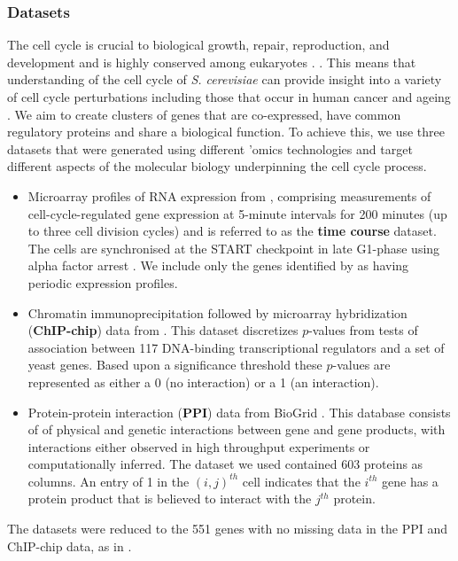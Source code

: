 \documentclass{bmcart}
\begin{document}
	\subsubsection*{Datasets}
	The cell cycle is crucial to biological growth, repair, reproduction, and development \citep{tyson2013cell, chen2004integrative, alberts2018molecular} and is highly conserved among eukaryotes \citep{alberts2018molecular}. . This means that understanding of the cell cycle of \emph{S. cerevisiae} can provide insight into a variety of cell cycle perturbations including those that occur in human cancer \citep{ingalls2007systems, chen2004integrative} and ageing \citep{jimenez2015live}. We aim to create clusters of genes that are co-expressed, have common regulatory proteins and share a biological function. To achieve this, we use three datasets that were generated using different 'omics technologies and target different aspects of the molecular biology underpinning the cell cycle process.
	\begin{itemize}
		\item Microarray profiles of RNA expression from \cite{granovskaia2010high}, comprising measurements of cell-cycle-regulated gene expression at 5-minute intervals for 200 minutes (up to three cell division cycles) and is referred to as the \textbf{time course} dataset. The cells are synchronised at the START checkpoint in late G1-phase using alpha factor arrest \citep{granovskaia2010high}. We include only the genes identified by \cite{granovskaia2010high} as having periodic expression profiles.
		\item Chromatin immunoprecipitation followed by microarray hybridization (\textbf{ChIP-chip}) data from \cite{harbison2004transcriptional}. This dataset discretizes $p$-values from tests of association between 117 DNA-binding transcriptional regulators and a set of yeast genes. Based upon a significance threshold these $p$-values are represented as either a 0 (no interaction) or a 1 (an interaction).
		\item Protein-protein interaction (\textbf{PPI}) data from BioGrid \citep{stark2006biogrid}. This database consists of of physical and genetic interactions between gene and gene products, with interactions either observed in high throughput experiments or computationally inferred. The dataset we used contained 603 proteins as columns. An entry of 1 in the $(i, j)^{th}$ cell indicates that the $i^{th}$ gene has a protein product that is believed to interact with the $j^{th}$ protein.
	\end{itemize}
	The datasets were reduced to the 551 genes with no missing data in the PPI and ChIP-chip data, as in \cite{kirk2012bayesian}. 
	
\end{document}
